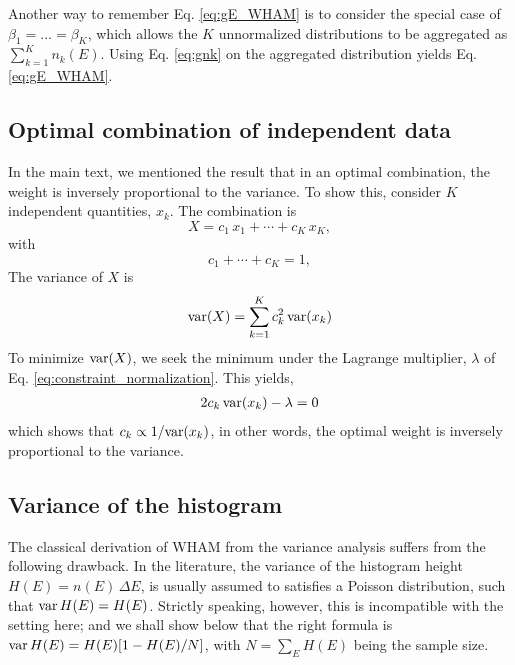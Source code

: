 \documentclass[aip,jcp,preprint,notitlepage, superscriptaddress]{revtex4-1}
\begin{document}
Another way to remember Eq. \eqref{eq:gE_WHAM}
is to consider the special case of
$\beta_1 = \dots = \beta_K$,
which allows
the $K$ unnormalized distributions
to be aggregated as
$\sum_{k=1}^K n_k(E)$.
%
Using Eq. \eqref{eq:gnk}
on the aggregated distribution
yields Eq. \eqref{eq:gE_WHAM}.



\subsection{Optimal combination of independent data}



In the main text,
we mentioned the result that
in an optimal combination,
the weight is inversely proportional to the variance.
%
To show this,
consider $K$ independent quantities,
$x_k$.
%
The combination is
\[
  X = c_1 \, x_1 + \cdots + c_K \, x_K,
\]
with
\begin{equation}
  c_1 + \cdots + c_K = 1,
  \label{eq:constraint_normalization}
\end{equation}
%
The variance of $X$ is
%
\begin{align*}
  \mathrm{var}(X)
=
\sum_{k = 1}^K c_k^2 \, \mathrm{var}(x_k)
\end{align*}
%
To minimize $\mathrm{var}(X)$,
we seek the minimum
under the Lagrange multiplier,
$\lambda$ of Eq. \eqref{eq:constraint_normalization}.
%
This yields,
%
\begin{align*}
  2 c_k \, \mathrm{var}(x_k) - \lambda = 0
\end{align*}
%
which shows that
$c_k \propto 1/\mathrm{var}(x_k)$,
in other words,
the optimal weight
is inversely proportional to the variance.



\subsection{Variance of the histogram}



The classical derivation of WHAM from the variance analysis
suffers from the following drawback.
%
In the literature,
the variance of the histogram height $H(E) = n(E) \, \Delta E$,
is usually assumed to satisfies a Poisson distribution,
such that $\mathrm{var} \, H(E) = H(E)$.
%
Strictly speaking, however,
this is incompatible with the setting here;
and we shall show below that
the right formula is
$\mathrm{var} \, H(E) = H(E) [ 1 - H(E)/N]$,
with $N = \sum_E H(E)$ being the sample size.
%
\end{document}
